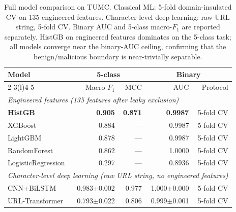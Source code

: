 \begin{table}[t]
\centering
\caption{Full model comparison on TUMC. Classical ML: 5-fold domain-insulated CV on 135 engineered features. Character-level deep learning: raw URL string, 5-fold CV. Binary AUC and 5-class macro-$F_1$ are reported separately. HistGB on engineered features dominates on the 5-class task; all models converge near the binary-AUC ceiling, confirming that the benign/malicious boundary is near-trivially separable.}
\label{tab:model-comparison-full}
\footnotesize
\begin{tabular}{lrrrr}
\toprule
Model & \multicolumn{2}{c}{5-class} & \multicolumn{2}{c}{Binary} \\
\cmidrule(r){2-3}\cmidrule(l){4-5}
 & Macro-$F_1$ & MCC & AUC & Protocol \\
\midrule
\multicolumn{5}{l}{\textit{Engineered features (135 features after leaky exclusion)}} \\
\midrule
\textbf{HistGB} & \textbf{0.905} & \textbf{0.871} & \textbf{0.9987} & 5-fold CV \\
XGBoost & 0.884 & --- & 0.9987 & 5-fold CV \\
LightGBM & 0.878 & --- & 0.9987 & 5-fold CV \\
RandomForest & 0.862 & --- & 1.0000 & 5-fold CV \\
LogisticRegression & 0.297 & --- & 0.8936 & 5-fold CV \\
\midrule
\multicolumn{5}{l}{\textit{Character-level deep learning (raw URL string, no engineered features)}} \\
\midrule
CNN+BiLSTM & 0.983$\pm$0.002 & 0.977 & 1.000$\pm$0.000 & 5-fold CV \\
URL-Transformer & 0.793$\pm$0.022 & 0.806 & 0.999$\pm$0.001 & 5-fold CV \\
\bottomrule
\end{tabular}
\end{table}